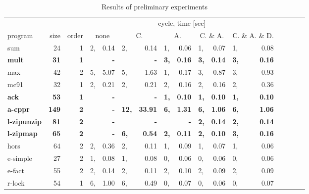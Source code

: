 \begin{table*}
\caption{Results of preliminary experiments}
\label{tbl:exp}
\small
\begin{center}
\begin{tabular}{|l|r|r|p{0pt}r|p{0pt}r|p{0pt}r|p{0pt}r|p{0pt}r|p{0pt}r|p{0pt}r|}
\hline
            &       &    & \multicolumn{10}{|c|}{cycle, time [sec]} \\
\cline{4-13}
program    & size & order & \multicolumn{2}{c}{none} &     \multicolumn{2}{|c|}{C.} &   \multicolumn{2}{|c|}{A.} & \multicolumn{2}{|c|}{C. \& A.} & \multicolumn{2}{|c|}{C. \& A. \& D.} \\
\hline
sum               &    24&  1&  2, &    0.14 &  2, &    0.14 &  1, &    0.06 &  1, &    0.07 &  1, &    0.08 \\
\bf mult              & \bf    31& \bf  1& \bf     & \bf       - & \bf     & \bf       - & \bf  3, & \bf    0.16 & \bf  3, & \bf    0.14 & \bf  3, & \bf    0.16 \\
max               &    42&  2&  5, &    5.07 &  5, &    1.63 &  1, &    0.17 &  3, &    0.87 &  3, &    0.93 \\
mc91              &    32&  1&  2, &    0.21 &  2, &    0.21 &  2, &    0.16 &  2, &    0.16 &  2, &    0.36 \\
\bf ack               & \bf    53& \bf  1& \bf     & \bf       - & \bf     & \bf       - & \bf  1, & \bf    0.10 & \bf  1, & \bf    0.10 & \bf  1, & \bf    0.10 \\
\bf a-cppr            & \bf   149& \bf  2& \bf     & \bf       - & \bf 12, & \bf   33.91 & \bf  6, & \bf    1.31 & \bf  6, & \bf    1.06 & \bf  6, & \bf    1.06 \\
\bf l-zipunzip        & \bf    81& \bf  2& \bf     & \bf       - & \bf     & \bf       - & \bf     & \bf       - & \bf  2, & \bf    0.14 & \bf  2, & \bf    0.14 \\
\bf l-zipmap          & \bf    65& \bf  2& \bf     & \bf       - & \bf  6, & \bf    0.54 & \bf  2, & \bf    0.11 & \bf  2, & \bf    0.10 & \bf  3, & \bf    0.16 \\
hors              &    64&  2&  2, &    0.36 &  2, &    0.11 &  1, &    0.09 &  1, &    0.07 &  1, &    0.06 \\
e-simple          &    27&  2&  1, &    0.08 &  1, &    0.08 &  0, &    0.06 &  0, &    0.06 &  0, &    0.06 \\
e-fact            &    55&  2&  2, &    0.14 &  2, &    0.11 &  2, &    0.10 &  2, &    0.09 &  2, &    0.09 \\
r-lock            &    54&  1&  6, &    1.00 &  6, &    0.49 &  0, &    0.07 &  0, &    0.06 &  0, &    0.07 \\

\end{tabular}
\end{center}
\end{table*}
